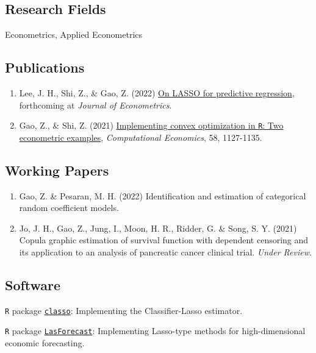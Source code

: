 \documentclass[letterpaper]{article}
\renewenvironment{itemize}{
  \begin{list}{}{
    \setlength{\leftmargin}{1.5em}
    \setlength{\itemsep}{0.25em}
    \setlength{\parskip}{0pt}
    \setlength{\parsep}{0.25em}
  }
}{
  \end{list}
}
\begin{document}
\subsection*{\bf Research Fields}
\begin{itemize}
  \item Econometrics, Applied Econometrics
\end{itemize}


\subsection*{\bf Publications}
\begin{enumerate}
  \item Lee, J. H., Shi, Z., \& Gao, Z. (2022) \href{https://www.sciencedirect.com/science/article/pii/S030440762100049X}{On LASSO for predictive regression}, forthcoming at \textit{Journal of Econometrics}.
  \item Gao, Z., \& Shi, Z. (2021) \href{https://link.springer.com/article/10.1007/s10614-020-09995-z}{Implementing convex optimization in {\tt R}: Two econometric examples}, {\it Computational Economics}, 58, 1127-1135.
\end{enumerate}

\subsection*{\bf Working Papers}
\begin{enumerate}[resume]
  \item  Gao, Z. \& Pesaran, M. H. (2022) Identification and estimation of categorical random coefficient models. 
  \item  Jo, J. H., Gao, Z., Jung, I., Moon, H. R., Ridder, G. \& Song, S. Y. (2021)  Copula graphic estimation of survival function with dependent censoring and its application to an analysis of pancreatic cancer clinical trial. \textit{Under Review}.
\end{enumerate}


\subsection*{\bf Software}

\begin{itemize}
  \item \texttt{R} package \href{https://github.com/zhan-gao/classo}{{\texttt{classo}}}: Implementing the Classifier-Lasso estimator.
  \item \texttt{R} package \href{https://github.com/zhan-gao/LasForecast}{{\texttt{LasForecast}}}: Implementing Lasso-type methods for high-dimensional economic forecasting.
\end{itemize}
\end{document}
